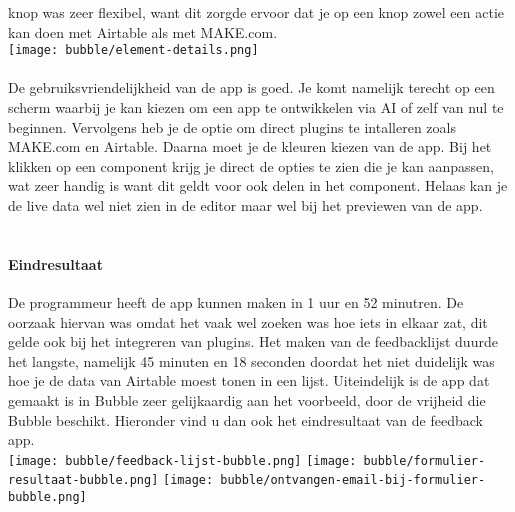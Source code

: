 knop was zeer flexibel, want dit zorgde ervoor dat je op een knop zowel een actie kan doen met Airtable als met MAKE.com.
\\
\texttt{[image: bubble/element-details.png]}
\\
\\
De gebruiksvriendelijkheid van de app is goed. Je komt namelijk terecht
op een scherm waarbij je kan kiezen om een app te ontwikkelen via AI of zelf van nul te beginnen. 
Vervolgens heb je de optie om direct plugins te intalleren zoals MAKE.com en Airtable. Daarna moet je de kleuren kiezen van de app.
Bij het klikken op een component krijg je direct de opties te zien die je kan aanpassen, wat zeer handig is want dit geldt voor ook delen in het component. Helaas 
kan je de live data wel niet zien in de editor maar wel bij het previewen van de app.
\\
\\
\paragraph*{Eindresultaat}
De programmeur heeft de app kunnen maken in 1 uur en 52 minutren. De oorzaak hiervan was omdat het vaak wel zoeken was hoe iets in elkaar zat, dit gelde ook bij het integreren van plugins.
Het maken van de feedbacklijst duurde het langste, namelijk 45 minuten en 18 seconden doordat het niet duidelijk was hoe je de data van Airtable moest tonen in een lijst.
Uiteindelijk is de app dat gemaakt is in Bubble zeer gelijkaardig aan het voorbeeld, door de vrijheid die Bubble beschikt. Hieronder vind u dan ook het eindresultaat van de feedback app.
\\
\texttt{[image: bubble/feedback-lijst-bubble.png]}
\texttt{[image: bubble/formulier-resultaat-bubble.png]}
\texttt{[image: bubble/ontvangen-email-bij-formulier-bubble.png]}
